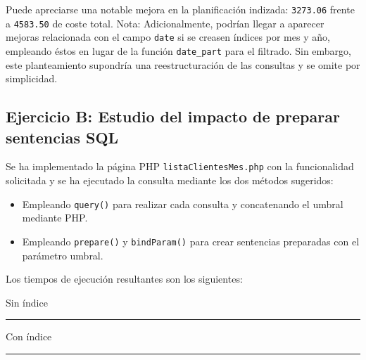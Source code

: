 \documentclass{article}
\begin{document}
Puede apreciarse una notable mejora en la planificación indizada: \texttt{3273.06} frente a \texttt{4583.50} de coste total.
\medbreak
{\small Nota: Adicionalmente, podrían llegar a aparecer mejoras relacionada con el campo \texttt{date} si se creasen índices por mes y año, empleando éstos en lugar de la función \texttt{date\_part} para el filtrado. Sin embargo, este planteamiento supondría una reestructuración de las consultas y se omite por simplicidad.}
\subsection{Ejercicio B: {\small Estudio del impacto de preparar sentencias SQL}}
Se ha implementado la página PHP \texttt{listaClientesMes.php} con la funcionalidad solicitada y se ha ejecutado la consulta mediante los dos métodos sugeridos:
\begin{itemize}
    \item Empleando \texttt{query()} para realizar cada consulta y concatenando el umbral mediante PHP.
    \item Empleando \texttt{prepare()} y \texttt{bindParam()} para crear sentencias preparadas con el parámetro umbral.
\end{itemize}
Los tiempos de ejecución resultantes son los siguientes:
\begin{multicols}{2}
    \begin{center}
        Sin índice
        \vspace{1mm}
        \hrule
    \end{center}
    \columnbreak
    \begin{center}
        Con índice
        \vspace{1mm}
        \hrule
    \end{center}
\end{multicols}
\vspace{-4mm}
\end{document}
